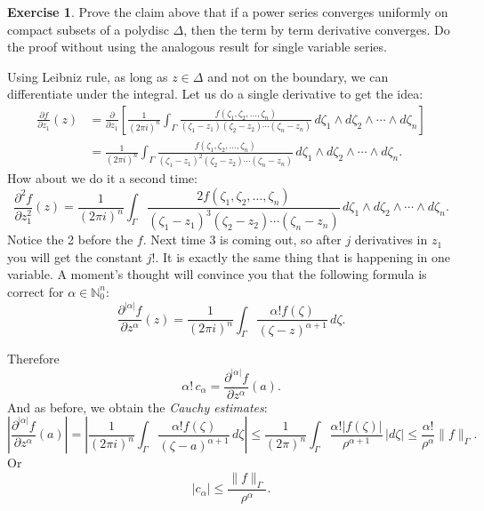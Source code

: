 \documentclass[12pt,openany]{book}
\newcommand{\sabs}[1]{\lvert {#1} \rvert}
\newcommand{\snorm}[1]{\lVert {#1} \rVert}
\newcommand{\abs}[1]{\left\lvert {#1} \right\rvert}
\newcommand{\N}{{\mathbb{N}}}
\newcommand{\myindex}[1]{#1\index{#1}}
\theoremstyle{plain}
\theoremstyle{remark}
\theoremstyle{definition}
\newenvironment{exbox}{%
    \def\FrameCommand{\vrule width 1pt \relax\hspace {10pt}}%
    \MakeFramed {\advance \hsize -\width \FrameRestore }%
}{%
    \endMakeFramed
}
\theoremstyle{exercise}
\newtheorem{exercise}{Exercise}[section]
\theoremstyle{example}
\begin{document}
\begin{exbox}
\begin{exercise}
Prove the claim above that if a power series converges uniformly on compact
subsets of a polydisc $\Delta$, then the term by term derivative converges.
Do the proof without using the analogous result for single variable series.
\end{exercise}
\end{exbox}

Using Leibniz rule, as long as $z \in \Delta$ and not on the boundary,
we can differentiate under the integral.  Let us do a single derivative to
get the idea:
\begin{equation*}
\begin{split}
\frac{\partial f}{\partial z_1}(z) &=
\frac{\partial}{\partial z_1} \left[
\frac{1}{{(2\pi i)}^n}
\int_{\Gamma}
\frac{f(\zeta_1,\zeta_2,\ldots,\zeta_n)}{(\zeta_1-z_1)(\zeta_2-z_2)\cdots(\zeta_n-z_n)}
\,
d \zeta_1 
\wedge
d \zeta_2
\wedge
\cdots
\wedge
d \zeta_n 
\right]
\\
& =
\frac{1}{{(2\pi i)}^n}
\int_{\Gamma}
\frac{f(\zeta_1,\zeta_2,\ldots,\zeta_n)}{{(\zeta_1-z_1)}^2(\zeta_2-z_2)\cdots(\zeta_n-z_n)}
\,
d \zeta_1 
\wedge
d \zeta_2
\wedge
\cdots
\wedge
d \zeta_n .
\end{split}
\end{equation*}
How about we do it a second time:
\begin{equation*}
\frac{\partial^2 f}{\partial z_1^2}(z) 
=
\frac{1}{{(2\pi i)}^n}
\int_{\Gamma}
\frac{2 f(\zeta_1,\zeta_2,\ldots,\zeta_n)}{{(\zeta_1-z_1)}^3(\zeta_2-z_2)\cdots(\zeta_n-z_n)}
\,
d \zeta_1 
\wedge
d \zeta_2
\wedge
\cdots
\wedge
d \zeta_n .
\end{equation*}
Notice the 2 before the $f$.  Next time 3 is coming out, so after $j$
derivatives in $z_1$ you will get the constant $j!$.
It is exactly the same thing that is happening in one variable.  A moment's
thought will convince you that the following formula is correct for
$\alpha \in \N_0^n$:
\begin{equation*}
\frac{\partial^{\sabs{\alpha}}f}{\partial z^\alpha} (z) =
\frac{1}{{(2\pi i)}^n}
\int_{\Gamma}
\frac{\alpha! f(\zeta)}{{(\zeta-z)}^{\alpha+1}}
\,
d \zeta .
\end{equation*}

Therefore
\begin{equation*}
\alpha! \, c_\alpha = 
\frac{\partial^{\sabs{\alpha}} f}{\partial z^\alpha} (a) .
\end{equation*}
And as before, we obtain the \emph{\myindex{Cauchy estimates}}:
\begin{equation*}
\abs{\frac{\partial^{\sabs{\alpha}}f}{\partial z^\alpha}(a)}
=
\abs{
\frac{1}{{(2\pi i)}^n}
\int_{\Gamma}
\frac{\alpha! f(\zeta)}{{(\zeta-a)}^{\alpha+1}}
\,
d \zeta }
\leq
\frac{1}{{(2\pi)}^n}
\int_{\Gamma}
\frac{\alpha! \sabs{f(\zeta)}}{\rho^{\alpha+1}}
\,
\sabs{d \zeta}
\leq
\frac{\alpha!}{\rho^\alpha}
\snorm{f}_\Gamma .
\end{equation*}
Or
\begin{equation*}
\sabs{c_\alpha} \leq 
\frac{\snorm{f}_\Gamma}{\rho^\alpha} .
\end{equation*}
\end{document}
